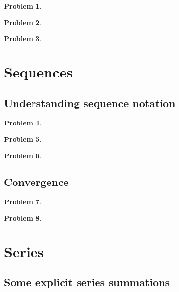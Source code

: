 \documentclass{article}
\newtheorem{problem}{Problem}
\begin{document}
\begin{problem}

\end{problem}
\begin{problem}

\end{problem}


\begin{problem}

\end{problem}

\section{Sequences}
\subsection{Understanding sequence notation}
\begin{problem}

\end{problem}
\begin{problem}

\end{problem}
\begin{problem}

\end{problem}

\subsection{Convergence}
\begin{problem}

\end{problem}
\begin{problem}

\end{problem}
\section{Series}
\subsection{Some explicit series summations}
\end{document}
